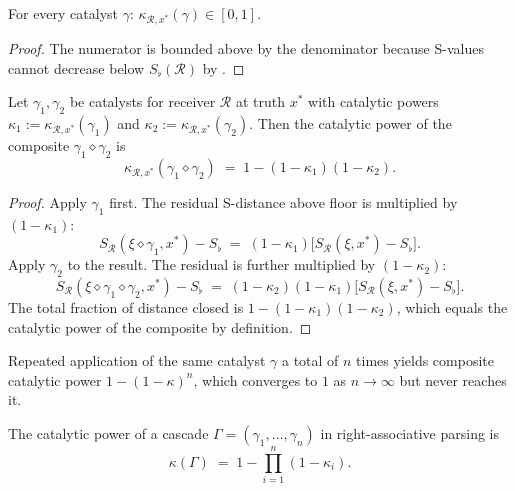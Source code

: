 \begin{lemma}
\label{lem:cat-power-range}
For every catalyst $\gamma$: $\kappa_{\mathcal{R}, x^*}(\gamma) \in [0, 1]$.
\end{lemma}

\begin{proof}
The numerator is bounded above by the denominator because S-values cannot
decrease below $S_\flat(\mathcal{R})$ by .
\end{proof}

\begin{theorem}
\label{thm:mult-cat-power}
Let $\gamma_1, \gamma_2$ be catalysts for receiver $\mathcal{R}$ at truth
$x^*$ with catalytic powers $\kappa_1 := \kappa_{\mathcal{R}, x^*}(\gamma_1)$
and $\kappa_2 := \kappa_{\mathcal{R}, x^*}(\gamma_2)$.  Then the catalytic
power of the composite $\gamma_1 \diamond \gamma_2$ is
\[
  \kappa_{\mathcal{R}, x^*}(\gamma_1 \diamond \gamma_2)
  \;=\; 1 - (1 - \kappa_1)(1 - \kappa_2) .
\]
\end{theorem}

\begin{proof}
Apply $\gamma_1$ first.  The residual S-distance above floor is multiplied
by $(1 - \kappa_1)$:
\[
  S_{\mathcal{R}}(\xi \diamond \gamma_1, x^*) - S_\flat
  \;=\; (1 - \kappa_1)\bigl[S_{\mathcal{R}}(\xi, x^*) - S_\flat\bigr].
\]
Apply $\gamma_2$ to the result.  The residual is further multiplied by
$(1 - \kappa_2)$:
\[
  S_{\mathcal{R}}(\xi \diamond \gamma_1 \diamond \gamma_2, x^*) - S_\flat
  \;=\; (1 - \kappa_2)(1 - \kappa_1)\bigl[S_{\mathcal{R}}(\xi, x^*) - S_\flat\bigr].
\]
The total fraction of distance closed is
$1 - (1 - \kappa_1)(1 - \kappa_2)$, which equals the catalytic power of
the composite by definition.
\end{proof}

\begin{corollary}
\label{cor:diminishing-returns}
Repeated application of the same catalyst $\gamma$ a total of $n$ times
yields composite catalytic power $1 - (1 - \kappa)^n$, which converges to
$1$ as $n \to \infty$ but never reaches it.
\end{corollary}

\begin{theorem}
\label{thm:cascade-comp}
The catalytic power of a cascade $\Gamma = (\gamma_1, \ldots, \gamma_n)$
in right-associative parsing is
\[
  \kappa(\Gamma) \;=\; 1 - \prod_{i=1}^n (1 - \kappa_i) .
\]
\end{theorem}

